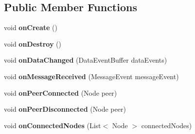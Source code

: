 \subsection*{Public Member Functions}
\begin{DoxyCompactItemize}
\item 
void {\bfseries on\+Create} ()\hypertarget{classcom_1_1google_1_1devrel_1_1wcl_1_1WclWearableListenerService_a77010438dbb3ba751237b1108db8fd22}{}\label{classcom_1_1google_1_1devrel_1_1wcl_1_1WclWearableListenerService_a77010438dbb3ba751237b1108db8fd22}

\item 
void {\bfseries on\+Destroy} ()\hypertarget{classcom_1_1google_1_1devrel_1_1wcl_1_1WclWearableListenerService_a8986918371a4b5540ff5382b81fe9212}{}\label{classcom_1_1google_1_1devrel_1_1wcl_1_1WclWearableListenerService_a8986918371a4b5540ff5382b81fe9212}

\item 
void {\bfseries on\+Data\+Changed} (Data\+Event\+Buffer data\+Events)\hypertarget{classcom_1_1google_1_1devrel_1_1wcl_1_1WclWearableListenerService_ae15b70d00086f67b6d4c3118d5db0cb9}{}\label{classcom_1_1google_1_1devrel_1_1wcl_1_1WclWearableListenerService_ae15b70d00086f67b6d4c3118d5db0cb9}

\item 
void {\bfseries on\+Message\+Received} (Message\+Event message\+Event)\hypertarget{classcom_1_1google_1_1devrel_1_1wcl_1_1WclWearableListenerService_a39ea49e608deb044d8af2db2fd54f772}{}\label{classcom_1_1google_1_1devrel_1_1wcl_1_1WclWearableListenerService_a39ea49e608deb044d8af2db2fd54f772}

\item 
void {\bfseries on\+Peer\+Connected} (Node peer)\hypertarget{classcom_1_1google_1_1devrel_1_1wcl_1_1WclWearableListenerService_a4ff48c9b3e5c6678a7e48d1f937497e8}{}\label{classcom_1_1google_1_1devrel_1_1wcl_1_1WclWearableListenerService_a4ff48c9b3e5c6678a7e48d1f937497e8}

\item 
void {\bfseries on\+Peer\+Disconnected} (Node peer)\hypertarget{classcom_1_1google_1_1devrel_1_1wcl_1_1WclWearableListenerService_a1b2d778a54a6fb4ee513e740f640b156}{}\label{classcom_1_1google_1_1devrel_1_1wcl_1_1WclWearableListenerService_a1b2d778a54a6fb4ee513e740f640b156}

\item 
void {\bfseries on\+Connected\+Nodes} (List$<$ Node $>$ connected\+Nodes)\hypertarget{classcom_1_1google_1_1devrel_1_1wcl_1_1WclWearableListenerService_a93447bf7fd8e594bcbc96067b02a75c1}{}\label{classcom_1_1google_1_1devrel_1_1wcl_1_1WclWearableListenerService_a93447bf7fd8e594bcbc96067b02a75c1}


\end{DoxyCompactItemize}

